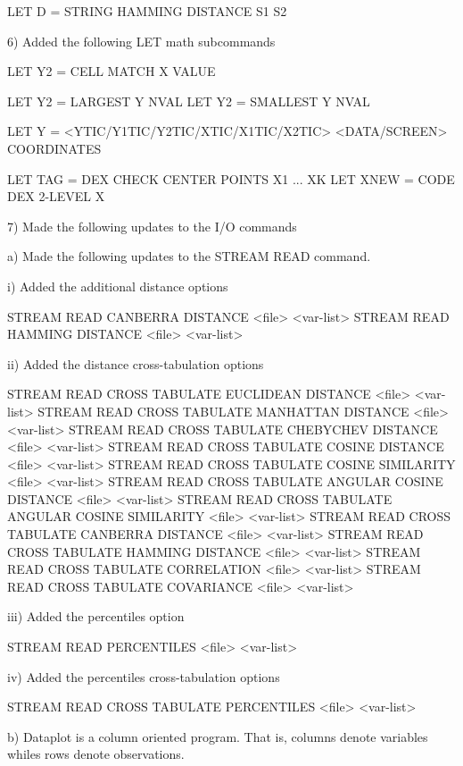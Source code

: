       LET D = STRING HAMMING DISTANCE S1 S2

 6) Added the following LET math subcommands

      LET Y2 = CELL MATCH X VALUE

      LET Y2 = LARGEST Y NVAL
      LET Y2 = SMALLEST Y NVAL

      LET Y = <YTIC/Y1TIC/Y2TIC/XTIC/X1TIC/X2TIC>  <DATA/SCREEN> COORDINATES

      LET TAG = DEX CHECK CENTER POINTS X1 ... XK
      LET XNEW = CODE DEX 2-LEVEL X

 7) Made the following updates to the I/O commands

    a) Made the following updates to the STREAM READ command.

         i) Added the additional distance options

               STREAM READ CANBERRA DISTANCE <file>  <var-list>
               STREAM READ HAMMING DISTANCE <file>  <var-list>

        ii) Added the distance cross-tabulation options

               STREAM READ CROSS TABULATE EUCLIDEAN DISTANCE <file>  <var-list>
               STREAM READ CROSS TABULATE MANHATTAN DISTANCE <file> <var-list>
               STREAM READ CROSS TABULATE CHEBYCHEV DISTANCE <file> <var-list>
               STREAM READ CROSS TABULATE COSINE DISTANCE <file> <var-list>
               STREAM READ CROSS TABULATE COSINE SIMILARITY <file> <var-list>
               STREAM READ CROSS TABULATE ANGULAR COSINE DISTANCE <file> <var-list>
               STREAM READ CROSS TABULATE ANGULAR COSINE SIMILARITY <file> <var-list>
               STREAM READ CROSS TABULATE CANBERRA DISTANCE <file> <var-list>
               STREAM READ CROSS TABULATE HAMMING DISTANCE <file> <var-list>
               STREAM READ CROSS TABULATE CORRELATION <file>  <var-list>
               STREAM READ CROSS TABULATE COVARIANCE <file>  <var-list>

       iii) Added the percentiles option

               STREAM READ PERCENTILES <file>  <var-list>

        iv) Added the percentiles cross-tabulation options

               STREAM READ CROSS TABULATE PERCENTILES <file>  <var-list>

    b) Dataplot is a column oriented program.  That is, columns
       denote variables whiles rows denote observations.

